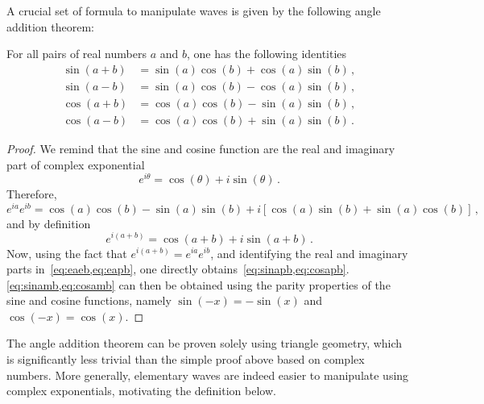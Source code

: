 A crucial set of formula to manipulate waves is given by the following angle addition
theorem:
\begin{theorem}
  \label{thm:angle-add}
  For all pairs of real numbers $a$ and $b$, one has the following identities
  \begin{align}
    \sin(a+b)&=\sin(a)\cos(b)+\cos(a)\sin(b)\,,\label{eq:sinapb}\\
    \sin(a-b)&=\sin(a)\cos(b)-\cos(a)\sin(b)\,,\label{eq:sinamb}\\
    \cos(a+b)&=\cos(a)\cos(b)-\sin(a)\sin(b)\,,\label{eq:cosapb}\\
    \cos(a-b)&=\cos(a)\cos(b)+\sin(a)\sin(b)\,.\label{eq:cosamb}
  \end{align}
\end{theorem}
\begin{proof}
  We remind that the sine and cosine function are the real and imaginary part of complex
  exponential
  \begin{equation}
    e^{i\theta}=\cos(\theta)+i\sin(\theta)\,.
  \end{equation}
  Therefore,
  \begin{equation}
    e^{i a}e^{i b}=\cos(a)\cos(b)-\sin(a)\sin(b)+i[\cos(a)\sin(b)+\sin(a)\cos(b)]\,,\label{eq:eaeb}
  \end{equation}
  and by definition
  \begin{equation}
    e^{i(a+b)}=\cos(a+b)+i\sin(a+b)\,.\label{eq:eapb}
  \end{equation}
  Now, using the fact that $e^{i(a+b)}=e^{i a}e^{i b}$, and identifying the real and
  imaginary parts in~\cref{eq:eaeb,eq:eapb}, one directly
  obtains~\cref{eq:sinapb,eq:cosapb}. \cref{eq:sinamb,eq:cosamb} can then be obtained
  using the parity properties of the sine and cosine functions, namely $\sin(-x)=-\sin(x)$
  and $\cos(-x)=\cos(x)$.
\end{proof}
The angle addition theorem can be proven solely using triangle geometry, which is
significantly less trivial than the simple proof above based on complex numbers. More
generally, elementary waves are indeed easier to manipulate using complex exponentials,
motivating the definition below.
